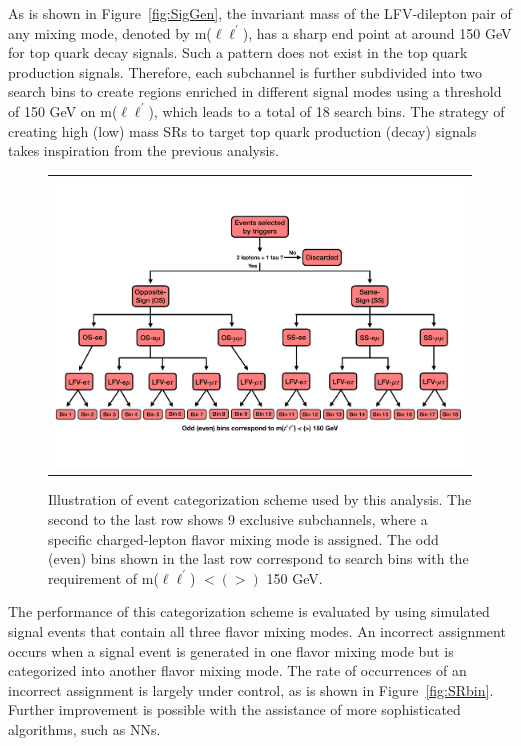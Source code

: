 As is shown in Figure~\ref{fig:SigGen}, the invariant mass of the LFV-dilepton pair of any mixing mode, denoted by m($\ell\ell^{\prime}$), has a sharp end point at around 150 GeV for top quark decay signals. Such a pattern does not exist in the top quark production signals. Therefore, each subchannel is further subdivided into two search bins to create regions enriched in different signal modes using a threshold of 150 GeV on m($\ell\ell^{\prime}$), which leads to a total of 18 search bins. The strategy of creating high (low) mass \acp{SR} to target top quark production (decay) signals takes inspiration from the previous analysis.

\begin{figure}[tbh!]
 \begin{center}
 \begin{tabular}{c}
 \includegraphics[width=\textwidth]{figures/Part4/Evt/SRFlowChart}
 \end{tabular}
 \caption{Illustration of event categorization scheme used by this analysis. The second to the last row shows 9 exclusive subchannels, where a specific charged-lepton flavor mixing mode is assigned. The odd (even) bins shown in the last row correspond to search bins with the requirement of m($\ell\ell^{\prime}$) $<(>)$ 150 GeV.}
 \label{fig:EvtCat}
 \end{center}
 \end{figure}
 
The performance of this categorization scheme is evaluated by using simulated signal events that contain all three flavor mixing modes. An incorrect assignment occurs when a signal event is generated in one flavor mixing mode but is categorized into another flavor mixing mode. The rate of occurrences of an incorrect assignment is largely under control, as is shown in Figure~\ref{fig:SRbin}. Further improvement is possible with the assistance of more sophisticated algorithms, such as \acp{NN}. 
 
